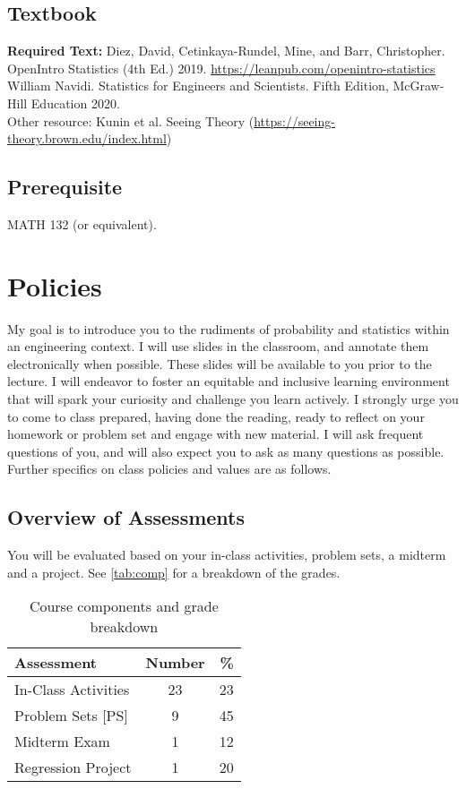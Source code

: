 \documentclass[11pt,twoside]{article}
\numberwithin{equation}{section}
\newcommand{\?}{\stackrel{?}{=}}
\begin{document}
\subsection{Textbook}

{\bf Required Text:}
Diez, David, Cetinkaya-Rundel, Mine, and Barr, Christopher. OpenIntro Statistics (4th Ed.) 2019.
\url{https://leanpub.com/openintro-statistics}\\

William Navidi. Statistics for Engineers and Scientists. Fifth Edition, McGraw-Hill Education 2020. \\

\noindent Other resource: Kunin et al. Seeing Theory (\url{https://seeing-theory.brown.edu/index.html})
\subsection{Prerequisite}
MATH 132 (or equivalent).

\section{Policies}
My goal is to introduce you to the rudiments of probability and statistics within an engineering context.
I will use slides in the classroom, and annotate them electronically when possible.
These slides will be available to you prior to the lecture.
I will endeavor to foster an equitable and inclusive learning environment that will spark your curiosity and challenge you learn actively.
I strongly urge you to come to class prepared, having done the reading, ready to reflect on your homework or problem set and engage with new material.
I will ask frequent questions of you, and will also expect you to ask as many questions as possible.
Further specifics on class policies and values are as follows.

\subsection{Overview of Assessments}
You will be evaluated based on your in-class activities, problem sets, a midterm and a project.
See \autoref{tab:comp} for a breakdown of the grades.

\begin{table}[h!]
  \centering
  \caption{Course components and grade breakdown}
  \label{tab:comp}  
  \begin{tabular}{l c  r}\toprule
    \bf Assessment & \bf Number & \bf \% \\ \midrule
    In-Class Activities  & 23 & 23 \\
    Problem Sets [PS]    & 9  & 45 \\
    Midterm Exam         & 1 &   12 \\
    Regression Project   & 1 &   20 \\ \bottomrule
  \end{tabular}
\end{table}
\end{document}
